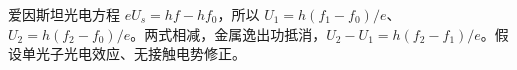 爱因斯坦光电方程 $eU_s=hf-hf_0$，所以 $U_1=h(f_1-f_0)/e$、$U_2=h(f_2-f_0)/e$。两式相减，金属逸出功抵消，$U_2-U_1=h(f_2-f_1)/e$。假设单光子光电效应、无接触电势修正。
